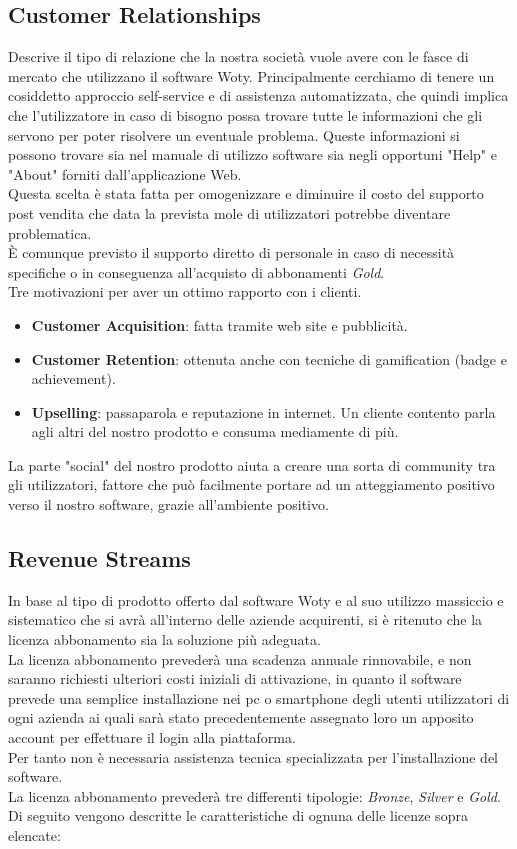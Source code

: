 \subsection{Customer Relationships}
Descrive il tipo di relazione che la nostra società vuole avere con le fasce di mercato che utilizzano il software Woty. Principalmente cerchiamo di tenere un cosiddetto approccio self-service e di assistenza automatizzata, che quindi implica che l'utilizzatore in caso di bisogno possa trovare tutte le informazioni che gli servono per poter risolvere un eventuale problema. Queste informazioni si possono trovare sia nel manuale di utilizzo software sia negli opportuni "Help" e "About" forniti dall'applicazione Web.\\
Questa scelta è stata fatta per omogenizzare e diminuire il costo del supporto post vendita che data la prevista mole di utilizzatori potrebbe diventare problematica.\\
È comunque previsto il supporto diretto di personale in caso di necessità specifiche o in conseguenza all'acquisto di abbonamenti \textit{Gold}. \\ Tre motivazioni per aver un ottimo rapporto con i clienti.
\begin{itemize}
\item \textbf{Customer Acquisition}: fatta tramite web site e pubblicità.
\item \textbf{Customer Retention}: ottenuta anche con tecniche di gamification (badge e achievement).
\item \textbf{Upselling}: passaparola e reputazione in internet. Un cliente contento parla agli altri del nostro prodotto e consuma mediamente di più.
\end{itemize}
La parte "social" del nostro prodotto aiuta a creare una sorta di community tra gli utilizzatori, fattore che può facilmente portare ad un atteggiamento positivo verso il nostro software, grazie all'ambiente positivo.

\subsection{Revenue Streams}
In base al tipo di prodotto offerto dal software Woty e al suo utilizzo massiccio e sistematico che si avrà all'interno delle aziende acquirenti, si è ritenuto che la licenza abbonamento sia la soluzione più adeguata.\\
La licenza abbonamento prevederà una scadenza annuale rinnovabile, e non saranno richiesti ulteriori costi iniziali di attivazione, in quanto il software prevede una semplice installazione nei pc o smartphone degli utenti utilizzatori di ogni azienda ai quali sarà stato precedentemente assegnato loro un apposito account per effettuare il login alla piattaforma.\\
Per tanto non è necessaria assistenza tecnica specializzata per l'installazione del software.\\
La licenza abbonamento prevederà tre differenti tipologie: \textit{Bronze}, \textit{Silver} e \textit{Gold}.
Di seguito vengono descritte le caratteristiche di ognuna delle licenze sopra elencate:

